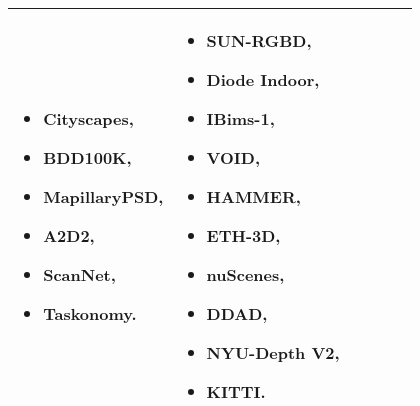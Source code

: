\begin{table}[H]
{\begin{tabular}{ |l|p{2cm}|p{2cm}|p{5cm}|p{5cm}|r| }
\begin{itemize}
        \item Cityscapes,
        \item BDD100K,
        \item MapillaryPSD,
        \item A2D2,
        \item ScanNet,
        \item Taskonomy.
        \end{itemize} & 
        \begin{itemize} 
            \item SUN-RGBD,
            \item Diode Indoor,
            \item IBims-1,
            \item VOID,
            \item HAMMER,
            \item ETH-3D,
            \item nuScenes,
            \item DDAD,
            \item NYU-Depth V2,
            \item KITTI.
        \end{itemize}\\
        \hline
        \end{tabular}%
    }
    \label{tabela_podsumowanie_algorytmy}
\end{table}

